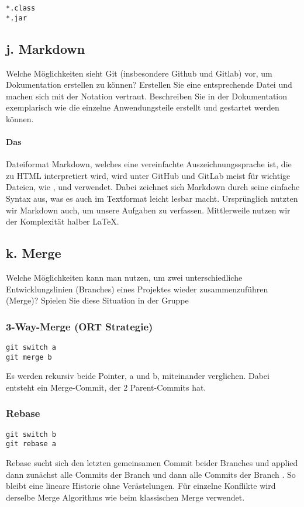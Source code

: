 \begin{lstlisting}[label={lst:gitignore}, caption={.gitignore}]
*.class
*.jar
\end{lstlisting}

\subsection{j. Markdown}\label{subsec:j.-markdown}
Welche Möglichkeiten sieht Git (insbesondere Github und Gitlab) vor, um Dokumentation erstellen zu können?
Erstellen Sie eine entsprechende Datei und machen sich mit der Notation vertraut.
Beschreiben Sie in der Dokumentation exemplarisch wie die einzelne Anwendungsteile erstellt und gestartet werden können.

\paragraph{Das} Dateiformat Markdown, welches eine vereinfachte Auszeichnungssprache ist, die zu HTML interpretiert wird, wird unter GitHub und GitLab meist für wichtige Dateien, wie ,  und  verwendet.
Dabei zeichnet sich Markdown durch seine einfache Syntax aus, was es auch im Textformat leicht lesbar macht.
Ursprünglich nutzten wir Markdown auch, um unsere Aufgaben zu verfassen.
Mittlerweile nutzen wir der Komplexität halber \LaTeX.

\subsection{k. Merge}\label{subsec:k.-merge}
Welche Möglichkeiten kann man nutzen, um zwei unterschiedliche Entwicklungslinien
(Branches) eines Projektes wieder zusammenzuführen (Merge)? Spielen Sie diese
Situation in der Gruppe

\subsubsection{3-Way-Merge (ORT Strategie)}
\begin{lstlisting}[label={lst:3-way-merge}, caption={3-Way-Merge}]
git switch a
git merge b
\end{lstlisting}

Es werden rekursiv beide Pointer, a und b, miteinander verglichen.
Dabei entsteht ein Merge-Commit, der 2 Parent-Commits hat.

\subsubsection{Rebase}
\begin{lstlisting}[label={lst:rebase}, caption={Rebase}]
git switch b
git rebase a
\end{lstlisting}

Rebase sucht sich den letzten gemeinsamen Commit beider Branches und applied dann zunächst alle Commits der Branch  und dann alle Commits der Branch .
So bleibt eine lineare Historie ohne Verästelungen.
Für einzelne Konflikte wird derselbe Merge Algorithms wie beim klassischen Merge verwendet.
